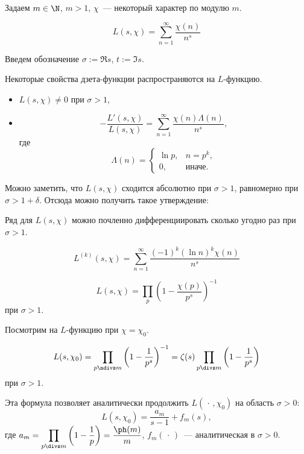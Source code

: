 Задаем $m \in \N$, $m > 1$, $\chi$~— некоторый характер по модулю $m$.

$$
  L(s, \chi) = \sum_{n = 1}^{\infty} \frac{\chi(n)}{n^s}
$$

Введем обозначение $\sigma := \Re s$, $t := \Im s$.

Некоторые свойства дзета-функции распространяются на $L$-функцию.

\begin{stm}
  \begin{itemize}
    \item $L(s, \chi) \ne 0$ при $\sigma > 1$,
    \item $$
    -\frac{L'(s, \chi)}{L(s, \chi)} = \sum_{n=1}^{\infty} \frac{\chi(n) \Lambda(n)}{n^s},$$ где
    $$
      \Lambda(n) = \begin{cases}
        \ln p,& n = p^k,\\
        0,& \mbox{иначе}.
      \end{cases}
    $$
  \end{itemize}
\end{stm}

Можно заметить, что $L(s, \chi)$ сходится абсолютно при $\sigma > 1$, равномерно при $\sigma > 1 + \delta$. Отсюда можно получить такое утверждение:
\begin{stm}
  Ряд для $L(s, \chi)$ можно почленно дифференциировать сколько угодно раз при $\sigma > 1$.
\end{stm}

\begin{stm}
  $$
    L^{(k)}(s, \chi) = \sum_{n = 1}^{\infty} \frac{(-1)^k(\ln n)^k\chi(n)}{n^s}
  $$
\end{stm}

\begin{stm}
  $$
    L(s, \chi) = \prod_{p} \left( 1 - \frac{\chi(p)}{p^s}\right)^{-1}
  $$
  при $\sigma > 1$.
\end{stm}

Посмотрим на $L$-функцию при $\chi = \chi_0$.

\begin{stm}
  $$
    L(s, \chi_0) = \prod_{p \ndivs m} \left( 1 - \frac{1}{p^s} \right)^{-1} = \zeta(s) \prod_{p \divs m} \left( 1 - \frac{1}{p^s}\right)
  $$
  при $\sigma > 1$.
\end{stm}

Эта формула позволяет аналитически продолжить $L(\,\cdot\,, \chi_0)$ на область $\sigma > 0$:
$$
  L(s, \chi_0) = \frac{a_m}{s - 1} + f_m(s),
$$
где $\displaystyle a_m = \prod_{p \divs m}\left(1 - \frac{1}{p}\right) = \frac{\ph(m)}{m}$, $f_m(\,\cdot\,)$~— аналитическая в $\sigma > 0$.

